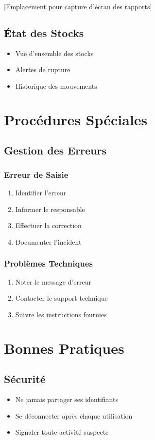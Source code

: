 \documentclass[14pt,a4paper]{report}
\begin{document}
[Emplacement pour capture d'écran des rapports]

\section{État des Stocks}
\begin{itemize}
    \item Vue d'ensemble des stocks
    \item Alertes de rupture
    \item Historique des mouvements
\end{itemize}

\chapter{Procédures Spéciales}

\section{Gestion des Erreurs}
\subsection{Erreur de Saisie}
\begin{enumerate}
    \item Identifier l'erreur
    \item Informer le responsable
    \item Effectuer la correction
    \item Documenter l'incident
\end{enumerate}

\subsection{Problèmes Techniques}
\begin{enumerate}
    \item Noter le message d'erreur
    \item Contacter le support technique
    \item Suivre les instructions fournies
\end{enumerate}

\chapter{Bonnes Pratiques}

\section{Sécurité}
\begin{itemize}
    \item Ne jamais partager ses identifiants
    \item Se déconnecter après chaque utilisation
    \item Signaler toute activité suspecte
\end{itemize}
\end{document}
